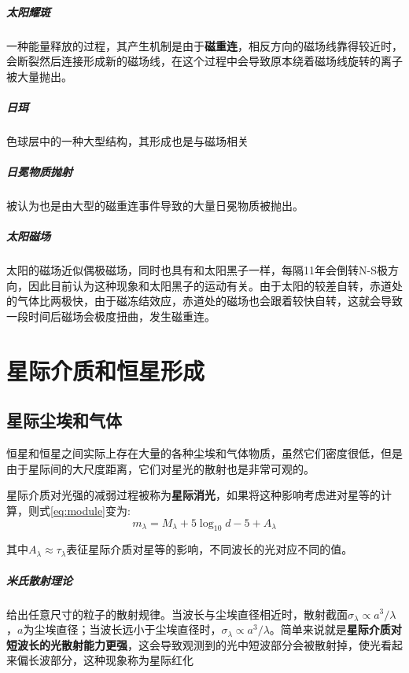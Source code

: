 \documentclass[openany]{ctexbook}
\begin{document}
\paragraph{太阳耀斑}
一种能量释放的过程，其产生机制是由于\textbf{磁重连}，相反方向的磁场线靠得较近时，会断裂然后连接形成新的磁场线，在这个过程中会导致原本绕着磁场线旋转的离子被大量抛出。

\paragraph{日珥}
色球层中的一种大型结构，其形成也是与磁场相关

\paragraph{日冕物质抛射}
被认为也是由大型的磁重连事件导致的大量日冕物质被抛出。

\paragraph{太阳磁场}
太阳的磁场近似偶极磁场，同时也具有和太阳黑子一样，每隔11年会倒转N-S极方向，因此目前认为这种现象和太阳黑子的运动有关。由于太阳的较差自转，赤道处的气体比两极快，由于磁冻结效应，赤道处的磁场也会跟着较快自转，这就会导致一段时间后磁场会极度扭曲，发生磁重连。

\chapter{星际介质和恒星形成}
\section{星际尘埃和气体}
恒星和恒星之间实际上存在大量的各种尘埃和气体物质，虽然它们密度很低，但是由于星际间的大尺度距离，它们对星光的散射也是非常可观的。

星际介质对光强的减弱过程被称为\textbf{星际消光}，如果将这种影响考虑进对星等的计算，则式\ref{eq:module}变为:
\begin{equation}
  m_\lambda=M_\lambda+5\log_{10}d-5+A_\lambda
\end{equation}

其中$A_\lambda \approx \tau_\lambda$表征星际介质对星等的影响，不同波长的光对应不同的值。

\paragraph{米氏散射理论}
给出任意尺寸的粒子的散射规律。当波长与尘埃直径相近时，散射截面$\sigma_\lambda \propto a^3/\lambda$，$a$为尘埃直径；当波长远小于尘埃直径时，$\sigma_\lambda \propto a^3/\lambda$。简单来说就是\textbf{星际介质对短波长的光散射能力更强}，这会导致观测到的光中短波部分会被散射掉，使光看起来偏长波部分，这种现象称为星际红化
\end{document}
